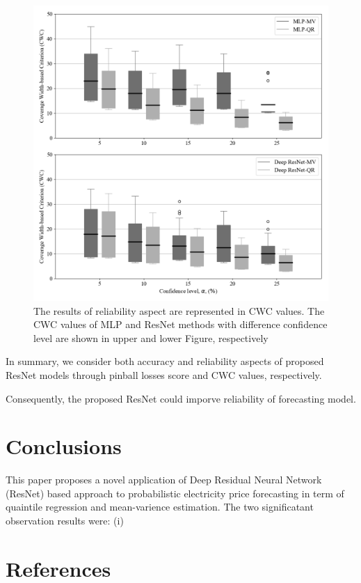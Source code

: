 \documentclass[review]{elsarticle}
\begin{document}
    \begin{figure}[H]
      \centering
      \includegraphics[width=12cm]{boxcompare_MV-QR}
      \caption{The results of reliability aspect are represented in CWC values.
      The CWC values of MLP and ResNet methods with difference confidence level are shown in upper and lower Figure, respectively}
      \label{Fig:CWC}
    \end{figure}

    In summary, we consider both accuracy and reliability aspects of proposed ResNet models through pinball losses score and CWC values, respectively.

    Consequently, the proposed ResNet could imporve reliability of forecasting model.




  \section{Conclusions}
    This paper proposes a novel application of Deep Residual Neural Network (ResNet) based approach to probabilistic electricity price forecasting in term of quaintile regression and mean-varience estimation. The two significatant observation results were: (i)
  \section*{References}
  
\end{document}
